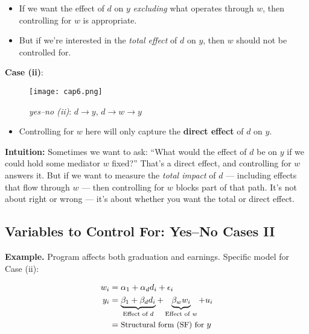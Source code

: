 \documentclass[12pt]{article}
\begin{document}
\begin{itemize}
  \item If we want the effect of $d$ on $y$ \textit{excluding} what operates through $w$, then controlling for $w$ is appropriate.
  \item But if we're interested in the \textit{total effect} of $d$ on $y$, then $w$ should not be controlled for.
\end{itemize}

\vspace{1em}

\textbf{Case (ii)}:

\begin{figure}[H]
  \centering
  \texttt{[image: cap6.png]} %
  \caption*{\textit{yes–no (ii)}: $d \rightarrow y$, $d \rightarrow w \rightarrow y$}
\end{figure}

\begin{itemize}
  \item Controlling for $w$ here will only capture the \textbf{direct effect} of $d$ on $y$.
\end{itemize}

\textbf{Intuition:}  
Sometimes we want to ask: “What would the effect of $d$ be on $y$ if we could hold some mediator $w$ fixed?” That’s a direct effect, and controlling for $w$ answers it. But if we want to measure the \textit{total impact} of $d$ — including effects that flow through $w$ — then controlling for $w$ blocks part of that path. It’s not about right or wrong — it’s about whether you want the total or direct effect.

\subsection*{\noindent\textbf{Variables to Control For: Yes–No Cases II}}

\textbf{Example.} Program affects both graduation and earnings.  
Specific model for Case (ii):

\begin{align}
w_i &= \alpha_1 + \alpha_d d_i + \epsilon_i \\
y_i &= \underbrace{\beta_1 + \beta_d d_i}_{\text{Effect of } d} + \underbrace{\beta_w w_i}_{\text{Effect of } w} + u_i \\
    &= \text{\small Structural form (SF) for } y
\end{align}
\end{document}
